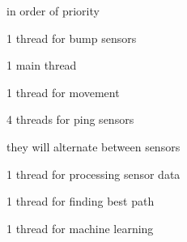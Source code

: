 in order of priority


\begin{DoxyItemize}
\item 1 thread for bump sensors
\item 1 main thread
\item 1 thread for movement
\item 4 threads for ping sensors
\begin{DoxyItemize}
\item they will alternate between sensors
\end{DoxyItemize}
\item 1 thread for processing sensor data
\item 1 thread for finding best path
\item 1 thread for machine learning 
\end{DoxyItemize}